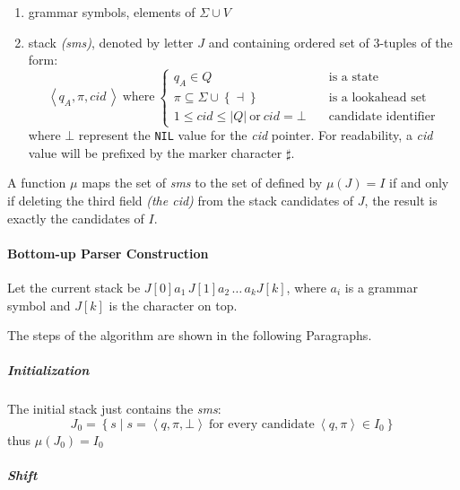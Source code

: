 \documentclass[english]{article}
\begin{document}
\begin{enumerate}
  \item grammar symbols, elements of \(\Sigma \cup V\)
  \item stack \mstates \textit{(sms)}, denoted by letter \(J\) and containing ordered set of \(3\)-tuples of the form:
        \[ \left\langle q_A, \pi, \textit{cid} \, \right\rangle \ \text{where} \ \begin{cases}
            q_A \in Q \quad                                                        & \text{is a state}           \\
            \pi \subseteq \Sigma \cup \left\{ \dashv \right\} \quad                & \text{is a lookahead set}   \\
            1 \leq \textit{cid} \leq | Q | \ \text{or} \ \textit{cid} = \bot \quad & \text{candidate identifier}
          \end{cases} \]
        where \(\bot\) represent the \texttt{NIL} value for the \textit{cid} pointer.
        For readability, a \textit{cid} value will be prefixed by the marker character \(\sharp\).
\end{enumerate}

A function \(\mu\) maps the set of \textit{sms} to the set of \mstates defined by \(\mu(J) = I\) if and only if deleting the third field \textit{(the cid)} from the stack candidates of \(J\), the result is exactly the candidates of \(I\).

\paragraph{Bottom-up Parser Construction}
\label{par:parser-algorithm-bottom-up}

Let the current stack be \(J[0] a_1 \, J[1] a_2 \, \ldots \, a_k J[k]\), where \(a_i\) is a grammar symbol and \(J[k]\) is the character on top.

The steps of the algorithm are shown in the following Paragraphs.

\subparagraph*{Initialization}

The initial stack just contains the \textit{sms}:
\[ J_0 = \left\{ s \mid s = \left\langle q, \pi, \bot \right\rangle \ \text{for every candidate} \ \left\langle q, \pi \right\rangle \in I_0 \right\} \]
thus \(\mu(J_0) = I_0\)

\subparagraph*{Shift}
\end{document}
